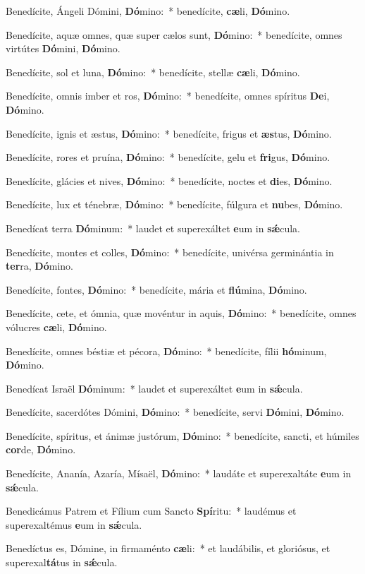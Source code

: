 \item Benedícite, Ángeli Dómini, \textbf{Dó}mino:~* benedícite, \textbf{cæ}li, \textbf{Dó}mino.
\item Benedícite, aquæ omnes, quæ super cælos sunt, \textbf{Dó}mino:~* benedícite, omnes virtútes \textbf{Dó}mini, \textbf{Dó}mino.
\item Benedícite, sol et luna, \textbf{Dó}mino:~* benedícite, stellæ \textbf{cæ}li, \textbf{Dó}mino.
\item Benedícite, omnis imber et ros, \textbf{Dó}mino:~* benedícite, omnes spíritus \textbf{De}i, \textbf{Dó}mino.
\item Benedícite, ignis et æstus, \textbf{Dó}mino:~* benedícite, frigus et \textbf{æs}tus, \textbf{Dó}mino.
\item Benedícite, rores et pruína, \textbf{Dó}mino:~* benedícite, gelu et \textbf{fri}gus, \textbf{Dó}mino.
\item Benedícite, glácies et nives, \textbf{Dó}mino:~* benedícite, noctes et \textbf{di}es, \textbf{Dó}mino.
\item Benedícite, lux et ténebræ, \textbf{Dó}mino:~* benedícite, fúlgura et \textbf{nu}bes, \textbf{Dó}mino.
\item Benedícat terra \textbf{Dó}minum:~* laudet et superexáltet \textbf{e}um in \textbf{sǽ}cula.
\item Benedícite, montes et colles, \textbf{Dó}mino:~* benedícite, univérsa germinántia in \textbf{ter}ra, \textbf{Dó}mino.
\item Benedícite, fontes, \textbf{Dó}mino:~* benedícite, mária et \textbf{flú}mina, \textbf{Dó}mino.
\item Benedícite, cete, et ómnia, quæ movéntur in aquis, \textbf{Dó}mino:~* benedícite, omnes vólucres \textbf{cæ}li, \textbf{Dó}mino.
\item Benedícite, omnes béstiæ et pécora, \textbf{Dó}mino:~* benedícite, fílii \textbf{hó}minum, \textbf{Dó}mino.
\item Benedícat Israël \textbf{Dó}minum:~* laudet et superexáltet \textbf{e}um in \textbf{sǽ}cula.
\item Benedícite, sacerdótes Dómini, \textbf{Dó}mino:~* benedícite, servi \textbf{Dó}mini, \textbf{Dó}mino.
\item Benedícite, spíritus, et ánimæ justórum, \textbf{Dó}mino:~* benedícite, sancti, et húmiles \textbf{cor}de, \textbf{Dó}mino.
\item Benedícite, Ananía, Azaría, Mísaël, \textbf{Dó}mino:~* laudáte et superexaltáte \textbf{e}um in \textbf{sǽ}cula.
\item Benedicámus Patrem et Fílium cum Sancto \textbf{Spí}ritu:~* laudémus et superexaltémus \textbf{e}um in \textbf{sǽ}cula.
\item Benedíctus es, Dómine, in firmaménto \textbf{cæ}li:~* et laudábilis, et gloriósus, et superexal\textbf{tá}tus in \textbf{sǽ}cula.

